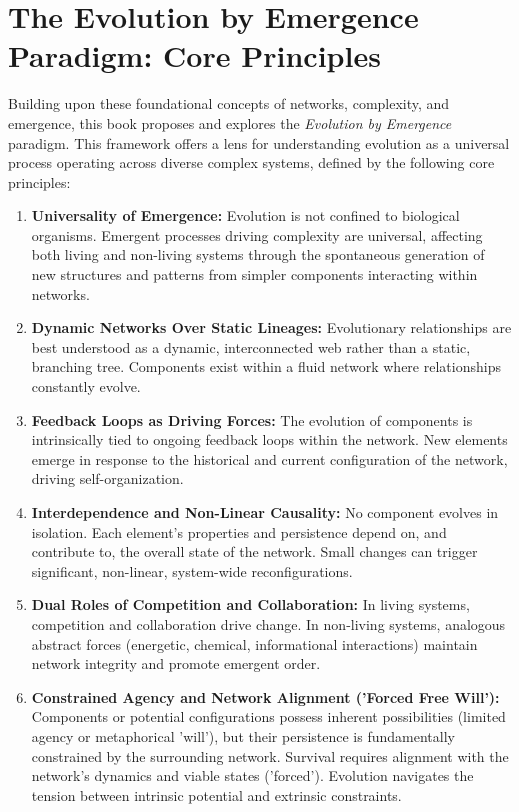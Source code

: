 \section*{The Evolution by Emergence Paradigm: Core Principles}

Building upon these foundational concepts of networks, complexity, and emergence, this book proposes and explores the \emph{Evolution by Emergence} paradigm. This framework offers a lens for understanding evolution as a universal process operating across diverse complex systems, defined by the following core principles:

\begin{enumerate}
    \item \textbf{Universality of Emergence:} Evolution is not confined to biological organisms. Emergent processes driving complexity are universal, affecting both living and non-living systems through the spontaneous generation of new structures and patterns from simpler components interacting within networks.

    \item \textbf{Dynamic Networks Over Static Lineages:} Evolutionary relationships are best understood as a dynamic, interconnected web rather than a static, branching tree. Components exist within a fluid network where relationships constantly evolve.

    \item \textbf{Feedback Loops as Driving Forces:} The evolution of components is intrinsically tied to ongoing feedback loops within the network. New elements emerge in response to the historical and current configuration of the network, driving self-organization.

    \item \textbf{Interdependence and Non-Linear Causality:} No component evolves in isolation. Each element’s properties and persistence depend on, and contribute to, the overall state of the network. Small changes can trigger significant, non-linear, system-wide reconfigurations.

    \item \textbf{Dual Roles of Competition and Collaboration:} In living systems, competition and collaboration drive change. In non-living systems, analogous abstract forces (energetic, chemical, informational interactions) maintain network integrity and promote emergent order.

    \item \textbf{Constrained Agency and Network Alignment ('Forced Free Will'):} Components or potential configurations possess inherent possibilities (limited agency or metaphorical 'will'), but their persistence is fundamentally constrained by the surrounding network. Survival requires alignment with the network's dynamics and viable states ('forced'). Evolution navigates the tension between intrinsic potential and extrinsic constraints.


\end{enumerate}
